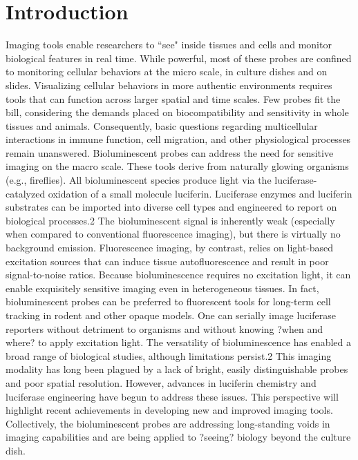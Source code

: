 \chapter{Introduction}
Imaging tools enable researchers to ``see" inside tissues and
cells and monitor biological features in real time. While
powerful, most of these probes are confined to monitoring
cellular behaviors at the micro scale, in culture dishes and on
slides. Visualizing cellular behaviors in more authentic environments
requires tools that can function across larger spatial and
time scales.\cite{Porterfield:2015bu} Few probes fit the bill, considering the demands
placed on biocompatibility and sensitivity in whole tissues and
animals. Consequently, basic questions regarding multicellular
interactions in immune function, cell migration, and other
physiological processes remain unanswered.
Bioluminescent probes can address the need for sensitive
imaging on the macro scale. These tools derive from naturally
glowing organisms (e.g., fireflies). All bioluminescent species
produce light via the luciferase-catalyzed oxidation of a small
molecule luciferin. Luciferase enzymes and luciferin substrates
can be imported into diverse cell types and engineered to
report on biological processes.2 The bioluminescent signal is
inherently weak (especially when compared to conventional
fluorescence imaging), but there is virtually no background
emission. Fluorescence imaging, by contrast, relies on light-based
excitation sources that can induce tissue autofluorescence
and result in poor signal-to-noise ratios. Because bioluminescence
requires no excitation light, it can enable
exquisitely sensitive imaging even in heterogeneous tissues. In
fact, bioluminescent probes can be preferred to fluorescent
tools for long-term cell tracking in rodent and other opaque
models. One can serially image luciferase reporters without
detriment to organisms and without knowing ?when and
where? to apply excitation light.
The versatility of bioluminescence has enabled a broad range
of biological studies, although limitations persist.2 This imaging
modality has long been plagued by a lack of bright, easily
distinguishable probes and poor spatial resolution. However,
advances in luciferin chemistry and luciferase engineering have
begun to address these issues. This perspective will highlight
recent achievements in developing new and improved imaging
tools. Collectively, the bioluminescent probes are addressing
long-standing voids in imaging capabilities and are being
applied to ?seeing? biology beyond the culture dish.
